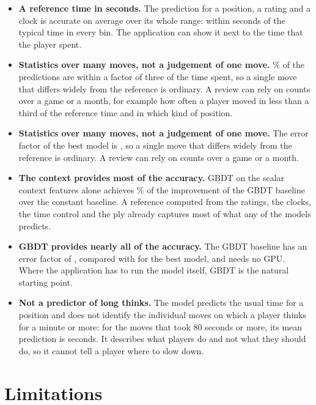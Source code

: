 \documentclass[11pt]{article}
\begin{document}
\begin{itemize}
\iflook
\item \textbf{A reference time in seconds.} The prediction for a position, a
rating and a clock is accurate on average over its whole range: within
 seconds of the typical time in every bin. The
application can show it next to the time that the player spent.
\item \textbf{Statistics over many moves, not a judgement of one move.}
\% of the predictions are within a factor of three of
the time spent, so a single move that differs widely from the reference is
ordinary. A review can rely on counts over a game or a month, for example how
often a player moved in less than a third of the reference time and in which
kind of position.
\else
\item \textbf{Statistics over many moves, not a judgement of one move.} The
error factor of the best model is , so a single move that
differs widely from the reference is ordinary. A review can rely on counts
over a game or a month.
\fi
\item \textbf{The context provides most of the accuracy.} GBDT on the scalar
context features alone achieves \% of the improvement
of the GBDT baseline over the constant baseline. A reference computed from
the ratings, the clocks, the time control and the ply already captures most
of what any of the models predicts.
\item \textbf{GBDT provides nearly all of the accuracy.} The GBDT baseline
has an error factor of , compared with
 for the best model, and needs no GPU. Where the
application has to run the model itself, GBDT is the natural starting point.
\item \textbf{Not a predictor of long thinks.} The model predicts the usual
time for a position and does not identify the individual moves on which a
player thinks for a minute or more\iflook: for the moves that took 80 seconds
or more, its mean prediction is 
seconds\fi. It describes what players do and not what they should do, so it
cannot tell a player where to slow down.
\end{itemize}

\section{Limitations}
\label{sec:limits}
\end{document}
